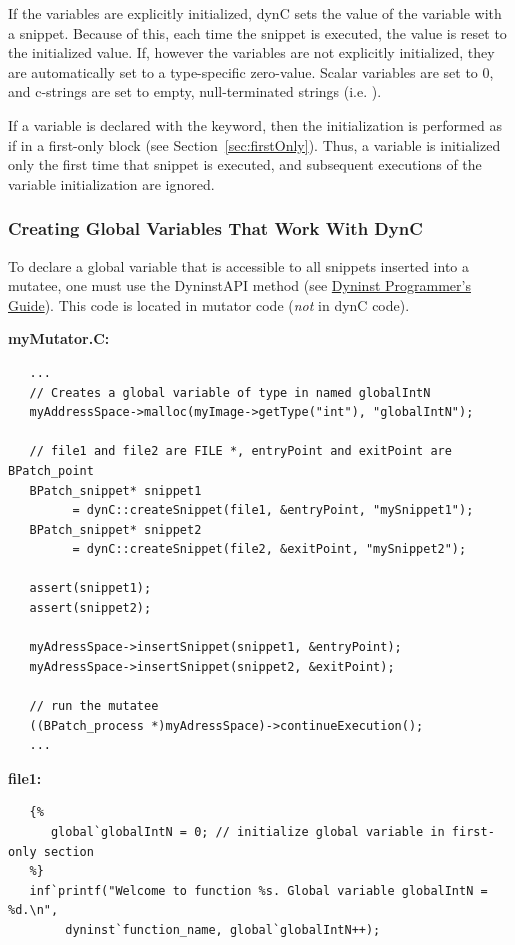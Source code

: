 If the variables are explicitly initialized, dynC sets the value of the variable
with a  snippet. Because of this, each
time the snippet is executed, the value is reset to the initialized value. If,
however the variables are not explicitly initialized, they are automatically set
to a type-specific zero-value. Scalar variables are set to 0, and c-strings are
set to empty, null-terminated strings (i.e. ).

If a variable is declared with the  keyword, then the
initialization is performed as if in a first-only block (see Section~\ref{sec:firstOnly}). Thus, a variable is initialized only the first time that
snippet is executed, and subsequent executions of the variable initialization
are ignored.

\subsubsection{Creating Global Variables That Work With DynC}

To declare a global variable that is accessible to all snippets inserted into a
mutatee, one must use the DyninstAPI \hspace{1pt}
 method (see \underline{Dyninst
Programmer's Guide}). This code is located in mutator code (\emph{not} in dynC
code).


\noindent \textbf{myMutator.C:}
\begin{lstlisting}
   ...
   // Creates a global variable of type in named globalIntN
   myAddressSpace->malloc(myImage->getType("int"), "globalIntN");

   // file1 and file2 are FILE *, entryPoint and exitPoint are BPatch_point
   BPatch_snippet* snippet1
         = dynC::createSnippet(file1, &entryPoint, "mySnippet1");
   BPatch_snippet* snippet2
         = dynC::createSnippet(file2, &exitPoint, "mySnippet2");

   assert(snippet1);
   assert(snippet2);

   myAdressSpace->insertSnippet(snippet1, &entryPoint);
   myAdressSpace->insertSnippet(snippet2, &exitPoint);

   // run the mutatee
   ((BPatch_process *)myAdressSpace)->continueExecution();
   ...
\end{lstlisting}
\noindent \textbf{file1:}
\begin{lstlisting}
   {%
      global`globalIntN = 0; // initialize global variable in first-only section
   %}
   inf`printf("Welcome to function %s. Global variable globalIntN = %d.\n",
        dyninst`function_name, global`globalIntN++);
\end{lstlisting}

